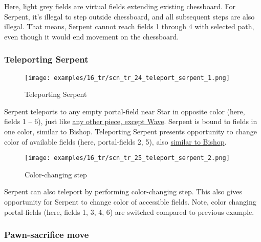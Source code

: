 Here, light grey fields are virtual fields extending existing chessboard.
For Serpent, it's illegal to step outside chessboard, and all subsequent
steps are also illegal. That means, Serpent cannot reach fields 1 through
4 with selected path, even though it would end movement on the chessboard.

\clearpage %

\subsubsection*{Teleporting Serpent}
\label{sec:Tamoanchan Revisited/Serpent/Movement/Teleporting Serpent}

\vspace*{-1.0\baselineskip}
\noindent
\begin{figure}[!h]
\texttt{[image: examples/16\_tr/scn\_tr\_24\_teleport\_serpent\_1.png]}
\caption{Teleporting Serpent}
\label{fig:scn_tr_24_teleport_serpent_1}
\end{figure}

Serpent teleports to any empty portal-field near Star in opposite color
(here, fields 1 -- 6), just like
\hyperref[fig:scn_n_02_teleport_init]{any other piece, except Wave}.
Serpent is bound to fields in one color, similar to Bishop. Teleporting
Serpent presents opportunity to change color of available fields (here,
portal-fields 2, 5), also
\hyperref[fig:scn_n_14_teleport_bishop]{similar to Bishop}.

\clearpage %

\vspace*{-1.0\baselineskip}
\noindent
\begin{figure}[!h]
\texttt{[image: examples/16\_tr/scn\_tr\_25\_teleport\_serpent\_2.png]}
\caption{Color-changing step}
\label{fig:scn_tr_25_teleport_serpent_2}
\end{figure}

Serpent can also teleport by performing color-changing step. This also
gives opportunity for Serpent to change color of accessible fields. Note,
color changing portal-fields (here, fields 1, 3, 4, 6) are switched
compared to previous example.

\clearpage %

\subsubsection*{Pawn-sacrifice move}
\label{sec:Tamoanchan Revisited/Serpent/Movement/Pawn-sacrifice move}

